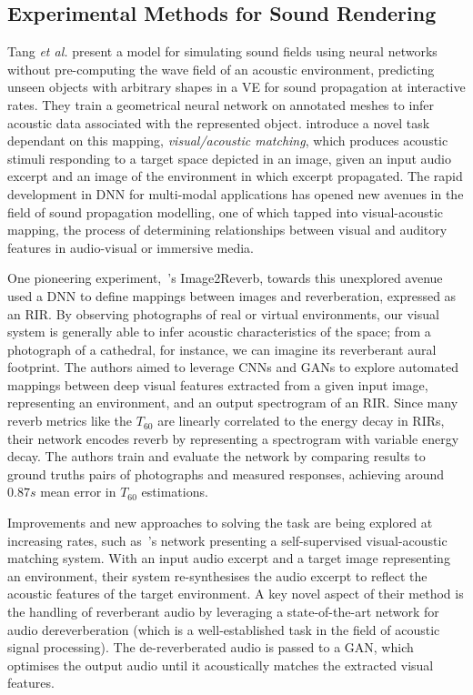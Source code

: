 \subsection{Experimental Methods for Sound Rendering}
Tang \textit{et al.} \cite{manocha2020differentiable} present a model for simulating sound fields using neural networks without pre-computing the wave field of an acoustic environment, predicting unseen objects with arbitrary shapes in a VE for sound propagation at interactive rates. They train a geometrical neural network on annotated meshes to infer acoustic data associated with the represented object.
\cite{chen2022visual} introduce a novel task dependant on this mapping, \textit{visual/acoustic matching}, which produces acoustic stimuli responding to a target space depicted in an image, given an input audio excerpt and an image of the environment in which excerpt propagated. The rapid development in DNN for multi-modal applications has opened new avenues in the field of sound propagation modelling, one of which tapped into visual-acoustic mapping, the process of determining relationships between visual and auditory features in audio-visual or immersive media.\par
One pioneering experiment,~\cite{Singh_2021_ICCV}'s Image2Reverb, towards this unexplored avenue used a DNN to define mappings between images and reverberation, expressed as an RIR. By observing photographs of real or virtual environments, our visual system is generally able to infer acoustic characteristics of the space; from a photograph of a cathedral, for instance, we can imagine its reverberant aural footprint. The authors aimed to leverage CNNs and GANs to explore automated mappings between deep visual features extracted from a given input image, representing an environment, and an output spectrogram of an RIR. Since many reverb metrics like the $T_{60}$ are linearly correlated to the energy decay in RIRs, their network encodes reverb by representing a spectrogram with variable energy decay. The authors train and evaluate the network by comparing results to ground truths pairs of photographs and measured responses, achieving around $0.87s$ mean error in $T_{60}$ estimations.\par
Improvements and new approaches to solving the task are being explored at increasing rates, such as~\cite{somayazulu2023self}'s network presenting a self-supervised visual-acoustic matching system. With an input audio excerpt and a target image representing an environment, their system re-synthesises the audio excerpt to reflect the acoustic features of the target environment. A key novel aspect of their method is the handling of reverberant audio by leveraging a state-of-the-art network for audio dereverberation (which is a well-established task in the field of acoustic signal processing). The de-reverberated audio is passed to a GAN, which optimises the output audio until it acoustically matches the extracted visual features.\par

